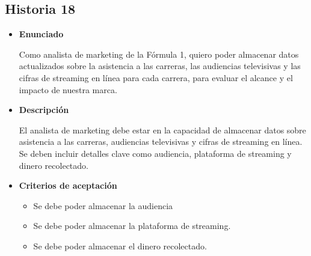 \documentclass{article}
\begin{document}
	\subsection{Historia 18}
	\begin{itemize}
		
		\item \large{\textbf{Enunciado}}
		\begin{description}
			Como analista de marketing de la Fórmula 1, quiero poder almacenar datos actualizados sobre la asistencia a las carreras, las audiencias televisivas y las cifras de streaming en línea para cada carrera, para  evaluar el alcance y el impacto de nuestra marca.
			
		\end{description}
		
		\item \large{\textbf{Descripción}}
		\begin{description}
		El analista de marketing debe estar en la capacidad de almacenar datos sobre asistencia a las carreras, audiencias televisivas y cifras de streaming en línea. Se deben incluir detalles clave como audiencia, plataforma de streaming y dinero recolectado.
			
		\end{description}
		
		\item \large{\textbf{Criterios de aceptación}}
		\begin{itemize}
			\item Se debe poder almacenar la audiencia
			\item Se debe poder almacenar la plataforma de streaming.
			\item Se debe poder almacenar el dinero recolectado.
		\end{itemize}
		
	\end{itemize}
	
\end{document}
